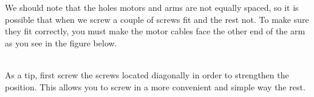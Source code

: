 \documentclass[12pt, a4paper,twoside]{tesi_upf}
\begin{document}
We should note that the holes motors and arms are not equally spaced, so it is possible that when we screw a couple of screws fit and the rest not. To make sure they fit correctly, you must make the motor cables face the other end of the arm as you see in the figure below.

\noindent%
\begin{minipage}{\linewidth}
\vspace{10 mm}
\label{motorArm}
\end{minipage}    
\\[12pt]

As a tip, first screw the screws located diagonally in order to strengthen the position. This allows you to screw in a more convenient and simple way the rest.
\\[12pt]
\end{document}
